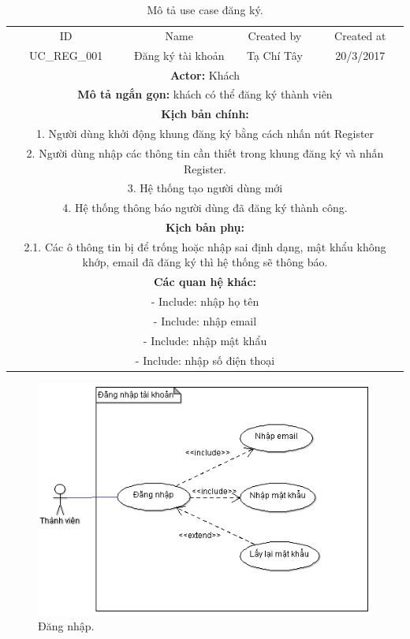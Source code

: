 \documentclass[a4paper,12pt,oneside]{article}
\begin{document}
\begin{table}[!htp]
\centering
\begin{tabularx}{\linewidth}{ |c||c|c|c| }
\hline
ID & Name & Created by & Created at\\
UC\_REG\_001 & Đăng ký tài khoản & Tạ Chí Tây & 20/3/2017\\
\hline
\multicolumn{4}{|X|}{\textbf{Actor:} Khách }\\
\hline
\multicolumn{4}{|X|}{\textbf{Mô tả ngắn gọn:} khách có thể đăng ký thành viên }\\
\hline
\multicolumn{4}{|X|}{\textbf{Kịch bản chính:}}\\
\multicolumn{4}{|X|}{1. Người dùng khởi động khung đăng ký bằng cách nhấn nút Register}\\
\multicolumn{4}{|X|}{
2.	Người dùng nhập các thông tin cần thiết trong khung đăng ký và nhấn Register.}\\
\multicolumn{4}{|X|}{
3.	Hệ thống tạo người dùng mới}\\
\multicolumn{4}{|X|}{
4.	Hệ thống thông báo người dùng đã đăng ký thành công.}\\
\hline
\multicolumn{4}{|X|}{\textbf{Kịch bản phụ:}}\\
\multicolumn{4}{|X|}{2.1. Các ô thông tin bị để trống hoặc nhập sai định dạng, mật khẩu không khớp, email đã đăng ký thì hệ thống sẽ thông báo.}\\
\hline
\multicolumn{4}{|X|}{\textbf{Các quan hệ khác:}}\\
\multicolumn{4}{|X|}{- Include: nhập họ tên}\\
\multicolumn{4}{|X|}{- Include: nhập email}\\
\multicolumn{4}{|X|}{- Include: nhập mật khẩu}\\
\multicolumn{4}{|X|}{- Include: nhập số điện thoại}\\
\hline
\end{tabularx}
\caption{Mô tả use case đăng ký.}
\end{table}

\begin{figure}[htp]
\centering
\includegraphics[scale=.9]{hinh/login.png}
\caption{Đăng nhập.}
\end{figure}
\end{document}
